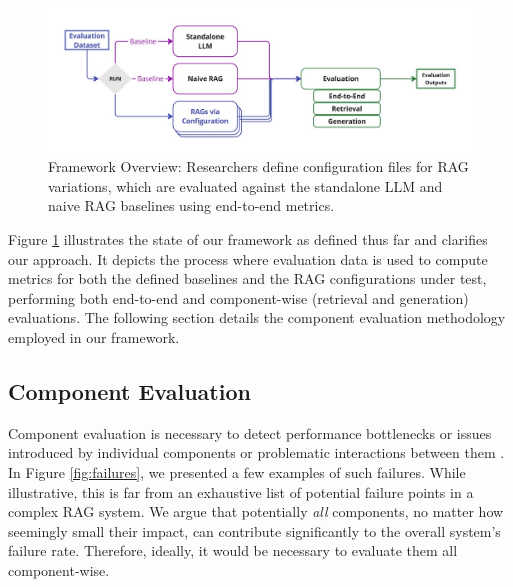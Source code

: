\begin{figure}[!ht]
  \centering
  \includegraphics[width=\textwidth]{images/FrameworkBaselines.pdf}
  \caption{Framework Overview: Researchers define configuration files for RAG variations, which are evaluated against the standalone LLM and naive RAG baselines using end-to-end metrics.}
  \label{fig:framework-baselines}
\end{figure}

Figure \ref{fig:framework-baselines} illustrates the state of our framework as defined thus far and clarifies our approach. It depicts the process where evaluation data is used to compute metrics for both the defined baselines and the RAG configurations under test, performing both end-to-end and component-wise (retrieval and generation) evaluations. The following section details the component evaluation methodology employed in our framework.

\subsection{Component Evaluation}

Component evaluation is necessary to detect performance bottlenecks or issues introduced by individual components or problematic interactions between them \cite{Salemi.2024}. In Figure \ref{fig:failures}, we presented a few examples of such failures. While illustrative, this is far from an exhaustive list of potential failure points in a complex RAG system. We argue that potentially \textit{all} components, no matter how seemingly small their impact, can contribute significantly to the overall system's failure rate. Therefore, ideally, it would be necessary to evaluate them all component-wise.

